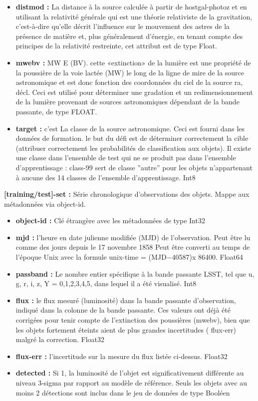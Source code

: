 \begin{itemize}
    \item \textbf{distmod :} La distance à la source calculée à partir de hostgal-photoz et en utilisant la relativité générale qui est une théorie relativiste de la gravitation, c’est-à-dire qu’elle décrit l’influence sur le mouvement des astres de la présence de matière et, plus généralement d’énergie, en tenant compte des principes de la relativité restreinte, cet attribut est de type Float.
    \item\textbf{mwebv :} MW E (BV). cette «extinction» de la lumière est une propriété de la poussière de la voie lactée (MW) le long de la ligne de mire de la source astronomique et est donc fonction des coordonnées du ciel de la source ra, décl. Ceci est utilisé pour déterminer une gradation et un redimensionnement de la lumière provenant de sources astronomiques dépendant de la bande passante, de type FLOAT.
    \item\textbf{target :} c’est La classe de la source astronomique. Ceci est fourni dans les données de formation. le but du défi est de déterminer correctement la cible (attribuer correctement les probabilités de classification aux objets). Il existe une classe dans l’ensemble de test qui ne se produit pas dans l’ensemble d’apprentissage : class-99 sert de classe ”autre” pour les objets n’appartenant à aucune des 14 classes de l’ensemble d’apprentissage. Int8
    \end{itemize}


\newline
\textbf{[training/test]-set :} Série chronologique d’observations des objets. Mappe aux métadonnées via object-id.
\begin{itemize}
    \item \textbf{object-id :} Clé étrangère avec les métadonnées de type Int32
    \item \textbf{ mjd :} l’heure en date julienne modifiée (MJD) de l’observation. Peut être lu comme des jours depuis le 17 novembre 1858 Peut être converti au temps de l’époque Unix avec la formule unix-time = (MJD−40587)x 86400. Float64
    \item \textbf{passband :} Le nombre entier spécifique à la bande passante LSST, tel que u, g, r, i, z, Y = 0,1,2,3,4,5, dans lequel il a été visualisé. Int8
    \item \textbf{flux :} le flux mesuré (luminosité) dans la bande passante d’observation, indiqué dans la colonne de la bande passante. Ces valeurs ont déjà été corrigées pour tenir compte de l’extinction des poussières (mwebv), bien que les objets fortement éteints aient de plus grandes incertitudes ( flux-err) malgré la correction. Float32
    \item \textbf{flux-err :} l’incertitude sur la mesure du flux listée ci-dessus. Float32
    \item \textbf{ detected :} Si 1, la luminosité de l’objet est significativement différente au niveau 3-sigma par rapport au modèle de référence. Seuls les objets avec au moins 2 détections sont inclus dans le jeu de données de type Booléen
\end{itemize}
\newline
